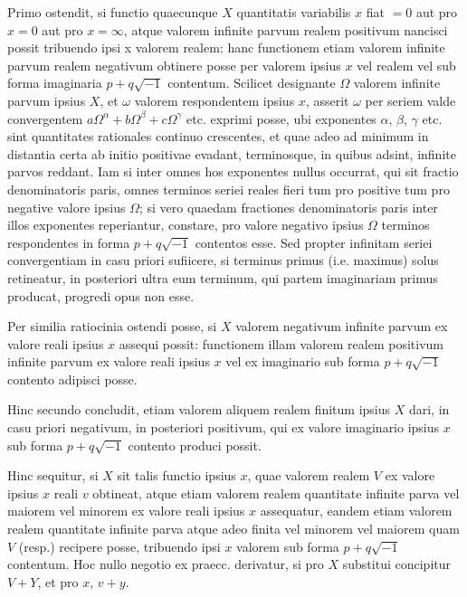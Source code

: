 \documentclass[twoside,12pt, showframe]{memoir}
\begin{document}
Primo ostendit, si functio quaecunque \(X\) quantitatis variabilis \(x\) fiat \(= 0\) aut pro \(x = 0\) aut pro \(x = \infty\), atque valorem infinite parvum realem positivum nancisci possit tribuendo ipsi x valorem realem: hanc functionem etiam valorem infinite parvum realem negativum obtinere posse per valorem ipsius \(x\) vel realem vel sub forma imaginaria \(p+q\surd{-1}\) contentum. Scilicet designante \(\Omega\) valorem infinite parvum ipsius \(X\), et \(\omega\) valorem respondentem ipsius \(x\), asserit \(\omega\) per seriem valde convergentem \(a\Omega^{\alpha} + b \Omega^{\beta} + c \Omega^{\gamma} \) etc{.} exprimi posse, ubi exponentes \(\alpha\), \(\beta\), \(\gamma\) etc{.} sint quantitates rationales continuo crescentes, et quae adeo ad minimum in distantia certa ab initio positivae evadant, terminosque, in quibus adsint, infinite parvos reddant. Iam si inter omnes hos exponentes nullus occurrat, qui sit fractio denominatoris paris, omnes terminos seriei reales fieri tum pro positive tum pro negative valore ipsius \(\Omega\); si vero quaedam fractiones denominatoris paris inter illos exponentes reperiantur, constare, pro valore negativo ipsius \(\Omega\) terminos respondentes in forma \(p+q\surd{-1}\) contentos esse. Sed propter infinitam seriei convergentiam in casu priori sufiicere, si terminus primus (i.e. maximus) solus retineatur, in posteriori ultra eum terminum, qui partem imaginariam primus producat, progredi opus non esse.

Per similia ratiocinia ostendi posse, si \(X\) valorem negativum infinite parvum ex valore reali ipsius \(x\) assequi possit: functionem illam valorem realem positivum infinite parvum ex valore reali ipsius \(x\) vel ex imaginario sub forma \(p+q\surd{-1}\)  contento adipisci posse.

Hinc secundo concludit, etiam valorem aliquem realem finitum ipsius \(X\) dari, in casu priori negativum, in posteriori positivum, qui ex valore imaginario ipsius \(x\) sub forma \(p+q\surd{-1}\)  contento produci possit.

Hinc sequitur, si \(X\) sit talis functio ipsius \(x\), quae valorem realem \(V\) ex valore ipsius \(x\) reali \(v\) obtineat, atque etiam valorem realem quantitate infinite parva vel maiorem vel minorem ex valore reali ipsius \(x\) assequatur, eandem etiam valorem realem quantitate infinite parva atque adeo finita vel minorem vel maiorem quam \(V\) (resp.) recipere posse, tribuendo ipsi \(x\) valorem sub forma \(p+q\surd{-1}\)  contentum. Hoc nullo negotio ex praecc. derivatur, si pro \(X\) substitui concipitur  \(V + Y\),  et pro \(x\), \(v+y\).
\end{document}
